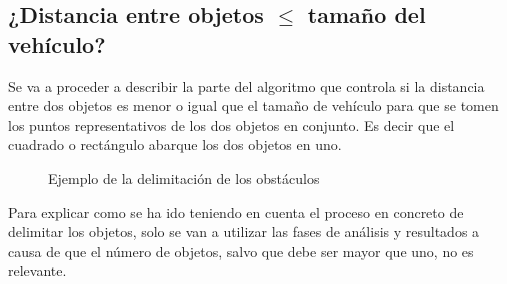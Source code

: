\subsection{¿Distancia entre objetos $\leq$ tamaño del vehículo?}

Se va a proceder a describir la parte del algoritmo que controla si la distancia entre dos objetos es menor o igual que el tamaño de vehículo para que se tomen los puntos representativos de los dos objetos en conjunto. Es decir que el cuadrado o rectángulo abarque los dos objetos en uno.

\begin{figure}[bhtp]
 \centering
 \caption{Ejemplo de la delimitación de los obstáculos}
 \label{fig:DetecciónObjetosSquare}
\end{figure}

Para explicar como se ha ido teniendo en cuenta el proceso en concreto de delimitar los objetos, solo se van a utilizar las fases de análisis y resultados a causa de que el número de objetos, salvo que debe ser mayor que uno, no es relevante. 

